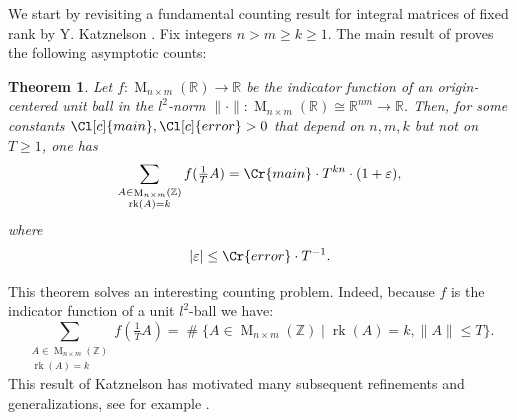 \documentclass{amsart}
\newcommand{\vlad}{\color{brown}}
\newtheorem{theorem}{Theorem}
\theoremstyle{definition}
\theoremstyle{remark}
\DeclareMathOperator{\M}{M}
\DeclareMathOperator{\card}{\texttt{\#}}
\DeclareMathOperator{\rank}{rk}
\begin{document}
We start by revisiting a fundamental counting result for integral matrices of fixed rank by Y. Katznelson \cite{K1994}. Fix integers $n > m \geq k \geq 1$. The main result of \cite{K1994} proves the following asymptotic counts: 
\begin{theorem}
    Let $f: \M_{n \times m}( \mathbb{R}) \rightarrow  \mathbb{R}$ be the indicator function of an origin-centered unit ball in the $l^{2}$-norm $\| \cdot \| : \M_{n \times m}(\mathbb{R})\cong \mathbb{R}^{nm} \rightarrow   \mathbb{R}$. 
    Then, for some constants $\Cl[c]{main}, \Cl[c]{error} > 0$ that depend on $n,m,k$ but not on $T \geq 1$, one has 
    \begin{equation}
        \sum_{\substack{A \in \M_{ n \times m }(\mathbb{Z}) \\ \rank(A) = k }} f( \tfrac{1}{T} A)  =  \Cr{main} \cdot T^{ k n} \cdot (1 + \varepsilon),
        \label{eq:main_eq1}
    \end{equation}
    where 
    \begin{equation}
        |\varepsilon| \leq \Cr{error} \cdot T^{-1}.
        \label{eq:error_term1}
    \end{equation}
    \label{th:main1}
\end{theorem}
This theorem solves an interesting counting problem. Indeed, because $f$ is the indicator function of a unit $l^{2}$-ball we have: 
\begin{equation}
    \sum_{\substack{A \in \M_{ n \times m }(\mathbb{Z}) \\ \rank(A) = k }} f( \tfrac{1}{T} A)  
    = \card \{A \in  \M_{n \times m}(\mathbb{Z}) \mid  \rank(A) = k, \|A\| \leq T \}.
\end{equation}
This result of Katznelson has motivated many subsequent refinements and generalizations, see for example \cite{MOS24,MOS25,B16}.
\end{document}
